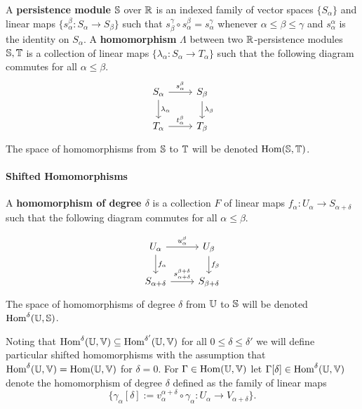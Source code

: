 
A \textbf{persistence module} $\S$ over $\R$ is an indexed family of vector spaces $\{S_\alpha\}$ and linear maps $\{s_\alpha^\beta : S_\alpha\to S_\beta\}$ such that $s^\gamma_\beta\circ s_\alpha^\beta = s_\alpha^\gamma$ whenever $\alpha\leq\beta\leq\gamma$ and $s_\alpha^\alpha$ is the identity on $S_\alpha$.
A \textbf{homomorphism} $\Lambda$ between two $\R$-persistence modules $\S, \T$ is a collection of linear maps $\{\lambda_\alpha : S_\alpha\to T_\alpha\}$ such that the following diagram commutes for all $\alpha\leq\beta$.
\begin{equation}\label{dgm:homomorphism}
  \begin{tikzcd}
    S_\alpha\arrow{r}{s_\alpha^\beta}\arrow{d}{\lambda_\alpha} &
    S_\beta\arrow{d}{\lambda_\beta}\\
    T_\alpha\arrow{r}{t_\alpha^\beta} &
    T_\beta
\end{tikzcd}\end{equation}
The space of homomorphisms from $\S$ to $\T$ will be denoted $\Hom(\S, \T)$.

\paragraph{Shifted Homomorphisms}

A \textbf{homomorphism of degree $\delta$} is a collection $F$ of linear maps $f_\alpha : U_\alpha\to S_{\alpha+\delta}$ such that the following diagram commutes for all $\alpha\leq\beta$.

\begin{equation}\label{dgm:shifted_homomorphism}
  \begin{tikzcd}
    U_\alpha\arrow{r}{u_\alpha^\beta}\arrow{d}{f_\alpha} &
    U_\beta\arrow{d}{f_\beta}\\
    S_{\alpha+\delta}\arrow{r}{s_{\alpha+\delta}^{\beta+\delta}} &
    S_{\beta +\delta}
\end{tikzcd}\end{equation}
The space of homomorphisms of degree $\delta$ from $\U$ to $\S$ will be denoted $\Hom^\delta(\U, \S)$.

Noting that $\Hom^\delta(\U,\V)\subseteq\Hom^{\delta'}(\U,\V)$ for all $0\leq\delta\leq\delta'$ we will define particular shifted homomorphisms with the assumption that $\Hom^\delta(\U,\V) = \Hom(\U,\V)$ for $\delta = 0$.
For $\Gamma\in\Hom(\U,\V)$ let $\Gamma[\delta]\in\Hom^\delta(\U,\V)$ denote the homomorphism of degree $\delta$ defined as the family of linear maps
\[\{\gamma_\alpha[\delta] := v_\alpha^{\alpha+\delta}\circ \gamma_\alpha : U_\alpha\to V_{\alpha+\delta}\}.\]


